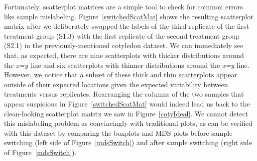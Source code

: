 \documentclass{bioinfo}
\begin{document}
Fortunately, scatterplot matrices are a simple tool to check for common errors like sample mislabeling. Figure~\ref{switchedScatMat} shows the resulting scatterplot matrix after we deliberately swapped the labels of the third replicate of the first treatment group (S1.3) with the first replicate of the second treatment group (S2.1) in the previously-mentioned cotyledon dataset. We can immediately see that, as expected, there are nine scatterplots with thicker distributions around the \textit{x=y} line and six scatterplots with thinner distributions around the \textit{x=y} line. However, we notice that a subset of these thick and thin scatterplots appear outside of their expected locations given the expected variability between treatments versus replicates. Rearranging the columns of the two samples that appear suspicious in Figure~\ref{switchedScatMat} would indeed lead us back to the clean-looking scatterplot matrix we saw in Figure~\ref{cotyIdeal}. We cannot detect this mislabeling problem as convincingly with traditional plots, as can be verified with this dataset by comparing the boxplots and MDS plots before sample switching (left side of Figure~\ref{mdsSwitch}) and after sample switching (right side of Figure~\ref{mdsSwitch}). 
\end{document}
